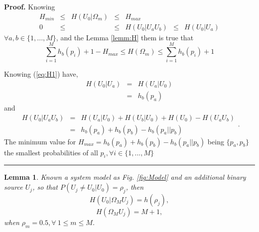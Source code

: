\documentclass[a4paper,10pt]{article}
\newtheorem{mylemma}[mytheorem]{Lemma}
\newenvironment{myproof}[1][Proof]{\textbf{#1.} }{\ \rule{0.5em}{0.5em}}
\begin{document}
\begin{myproof}
 \label{proof:Hin}
 Knowing 
\begin{equation}\label{eq:Hin1}
\begin{matrix}
 H_{min} & \leq & H(U_0|\Omega_m) & \leq & H_{max}       & ~    & ~\\
 0       & \leq & ~               & \leq & H(U_0|U_aU_b) & \leq &H(U_0|U_a)
\end{matrix}
\end{equation}
$\forall a,b \in \{1, ..., M\}$, and the Lemma \ref{lemm:H} them is true that
\begin{equation}\label{eq:Hin2}
 \sum_{i=1}^{M}{h_b(p_i)}+1 -H_{max} \leq H(\Omega_m) \leq \sum_{i=1}^{M}{h_b(p_i)}+1
\end{equation}

 Knowing (\ref{eq:H1}) have,  
 \begin{equation}\label{eq:Hin4}
\begin{matrix}
 H(U_0|U_a)&=&H(U_a|U_0)\\
       ~  &=&h_b(p_a)
\end{matrix}
\end{equation}
and 
\begin{equation}\label{eq:Hin5}
\begin{matrix}
H(U_0|U_aU_b) & = & H(U_a|U_0) + H(U_b|U_0) + H(U_0)- H(U_aU_b)  \\
 ~            & = & h_b(p_a) + h_b(p_b) - h_b(p_a||p_b)
 \end{matrix}.
\end{equation}
The minimum value for $H_{max}=h_b(p_a) + h_b(p_b) - h_b(p_a||p_b)$ being 
$\{p_a,p_b\}$ the smallest probabilities of all $p_i, \forall i \in \{1, ..., M\}$ 
\end{myproof}

\begin{mdframed}[style=MDFStyGrayScreen]
\begin{mylemma}
 \label{lemm:h0OmegaM_1}
 Known a system model as Fig. \ref{fig:Model} and an additional binary source $U_j$, so that $P(U_j\neq U_0|U_0)=\rho_j$, then
\begin{equation}\label{eq:h0OmegaM_1_a}
H(U_0|\Omega_M U_j) = h(\rho_j),
\end{equation}
\begin{equation}\label{eq:h0OmegaM_1_a2}
H(\Omega_M U_j) = M+1,
\end{equation}
when $\rho_m=0.5, \forall~1 \leq m\leq M$.
\end{mylemma}
\end{mdframed}
\end{document}
